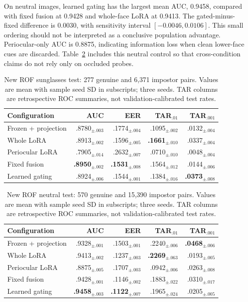 \documentclass[12pt,a4paper,oneside]{report}
\begin{document}
On neutral images, learned gating has the largest mean AUC, 0.9458, compared with fixed fusion at 0.9428 and whole-face LoRA at 0.9413. The gated-minus-fixed difference is 0.0030, with sensitivity interval $[-0.0046,0.0106]$. This small ordering should not be interpreted as a conclusive population advantage. Periocular-only AUC is 0.8875, indicating information loss when clean lower-face cues are discarded. Table~\ref{tab:rofneutral} includes this neutral control so that cross-condition claims do not rely only on occluded probes.
\begin{table}[t]
\centering
\setlength{\tabcolsep}{2.2pt}
\caption{New ROF sunglasses test: 277 genuine and 6,371 impostor pairs. Values are mean with sample seed SD in subscripts; three seeds. TAR columns are retrospective ROC summaries, not validation-calibrated test rates.}
\label{tab:rofsunglasses}
\begin{tabular}{lrrrr}
\toprule
Configuration & AUC & EER & TAR$_{.01}$ & TAR$_{.001}$\\
\midrule
Frozen + projection & .8780$_{\pm.003}$ & .1774$_{\pm.004}$ & .1095$_{\pm.002}$ & .0132$_{\pm.004}$\\
Whole LoRA & .8913$_{\pm.002}$ & .1596$_{\pm.005}$ & \textbf{.1661}$_{\pm.010}$ & .0337$_{\pm.004}$\\
Periocular LoRA & .7905$_{\pm.014}$ & .2632$_{\pm.007}$ & .0710$_{\pm.010}$ & .0048$_{\pm.004}$\\
Fixed fusion & \textbf{.8950}$_{\pm.002}$ & \textbf{.1531}$_{\pm.008}$ & .1564$_{\pm.012}$ & .0144$_{\pm.006}$\\
Learned gating & .8924$_{\pm.006}$ & .1544$_{\pm.001}$ & .1384$_{\pm.016}$ & \textbf{.0373}$_{\pm.008}$\\
\bottomrule
\end{tabular}
\end{table}
\begin{table}[t]
\centering
\setlength{\tabcolsep}{2.2pt}
\caption{New ROF neutral test: 570 genuine and 15,390 impostor pairs. Values are mean with sample seed SD in subscripts; three seeds. TAR columns are retrospective ROC summaries, not validation-calibrated test rates.}
\label{tab:rofneutral}
\begin{tabular}{lrrrr}
\toprule
Configuration & AUC & EER & TAR$_{.01}$ & TAR$_{.001}$\\
\midrule
Frozen + projection & .9328$_{\pm.001}$ & .1503$_{\pm.001}$ & .2240$_{\pm.006}$ & \textbf{.0468}$_{\pm.006}$\\
Whole LoRA & .9413$_{\pm.002}$ & .1237$_{\pm.003}$ & \textbf{.2269}$_{\pm.063}$ & .0193$_{\pm.005}$\\
Periocular LoRA & .8875$_{\pm.005}$ & .1707$_{\pm.003}$ & .0942$_{\pm.006}$ & .0263$_{\pm.008}$\\
Fixed fusion & .9428$_{\pm.001}$ & .1146$_{\pm.002}$ & .1883$_{\pm.022}$ & .0310$_{\pm.017}$\\
Learned gating & \textbf{.9458}$_{\pm.003}$ & \textbf{.1122}$_{\pm.007}$ & .1965$_{\pm.024}$ & .0205$_{\pm.005}$\\
\bottomrule
\end{tabular}
\end{table}
\end{document}
